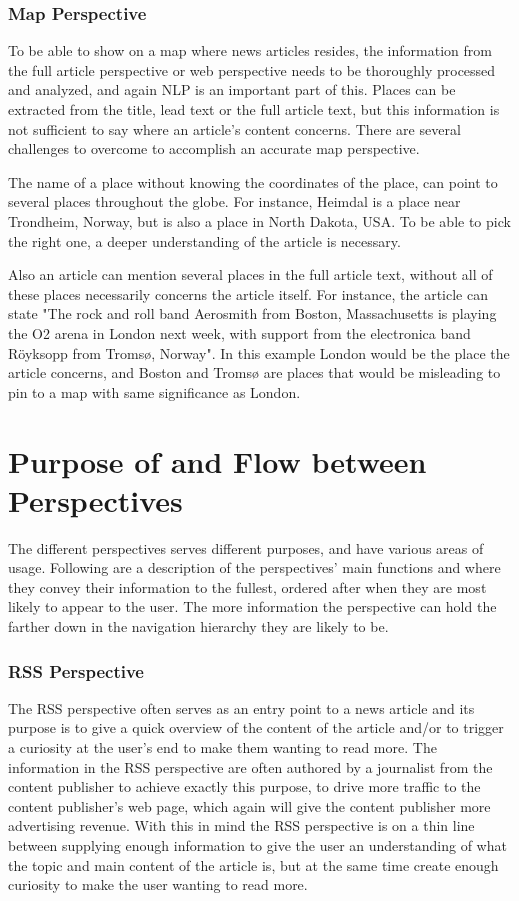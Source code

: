 \subsubsection{Map Perspective}
To be able to show on a map where news articles resides, the information from the full article perspective or web perspective needs to be thoroughly processed and analyzed, and again NLP is an important part of this. Places can be extracted from the title, lead text or the full article text, but this information is not sufficient to say where an article's content concerns. There are several challenges to overcome to accomplish an accurate map perspective. 

The name of a place without knowing the coordinates of the place, can point to several places throughout the globe. For instance, Heimdal is a place near Trondheim, Norway, but is also a place in North Dakota, USA. To be able to pick the right one, a deeper understanding of the article is necessary. 

Also an article can mention several places in the full article text, without all of these places necessarily concerns the article itself. For instance, the article can state "The rock and roll band Aerosmith from Boston, Massachusetts is playing the O2 arena in London next week, with support from the electronica band Röyksopp from Tromsø, Norway". In this example London would be the place the article concerns, and Boston and Tromsø are places that would be misleading to pin to a map with same significance as London.


\section{Purpose of and Flow between Perspectives}
The different perspectives serves different purposes, and have various areas of usage. Following are a description of the perspectives' main functions and where they convey their information to the fullest, ordered after when they are most likely to appear to the user. The more information the perspective can hold the farther down in the navigation hierarchy they are likely to be.


\subsubsection{RSS Perspective}
The RSS perspective often serves as an entry point to a news article and its purpose is to give a quick overview of the content of the article and/or to trigger a curiosity at the user's end to make them wanting to read more. The information in the RSS perspective are often authored by a journalist from the content publisher to achieve exactly this purpose, to drive more traffic to the content publisher's web page, which again will give the content publisher more advertising revenue. With this in mind the RSS perspective is on a thin line between supplying enough information to give the user an understanding of what the topic and main content of the article is, but at the same time create enough curiosity to make the user wanting to read more.

